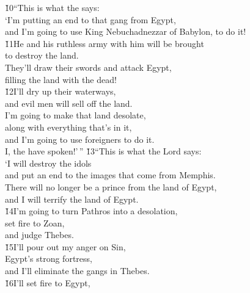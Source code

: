 \begin{poetry}
\poeml \v{10}``This is what the  says: \\
\poeml `I'm putting an end to that gang from Egypt, \\
\poemll    and I'm going to use King Nebuchadnezzar of Babylon, to do it! \\
\poeml \v{11}He and his ruthless army with him will be brought \\
\poemll    to destroy the land. \\
\poeml They'll draw their swords and attack Egypt, \\
\poemll    filling the land with the dead! \\
\poeml \v{12}I'll dry up their waterways, \\
\poemll    and evil men will sell off the land. \\
\poeml I'm going to make that land desolate, \\
\poemll    along with everything that's in it, \\
\poeml and I'm going to use foreigners to do it. \\
\poemll    I, the  have spoken!'\,''
\poeml \v{13}``This is what the Lord  says: \\
\poeml `I will destroy the idols \\
\poemll    and put an end to the images that come from Memphis. \\
\poeml There will no longer be a prince from the land of Egypt, \\
\poemll    and I will terrify the land of Egypt. \\
\poeml \v{14}I'm going to turn Pathros into a desolation, \\
\poemll    set fire to Zoan, \\
\poemlll       and judge Thebes. \\
\poeml \v{15}I'll pour out my anger on Sin, \\
\poemll    Egypt's strong fortress, \\
\poemlll       and I'll eliminate the gangs in Thebes. \\
\poeml \v{16}I'll set fire to Egypt, \\

\end{poetry}
